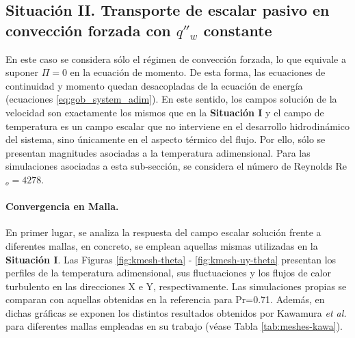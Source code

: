 \subsection{Situación II. Transporte de escalar pasivo en convección forzada con $q''_w$ constante}

En este caso se considera sólo el régimen de convección forzada, lo que equivale a suponer $\Pi=0$ en la ecuación de momento. De esta forma, las ecuaciones de continuidad y momento quedan desacopladas de la ecuación de energía (ecuaciones \ref{eq:gob_system_adim}). En este sentido, los campos solución de la velocidad son exactamente los mismos que en la \textbf{Situación I} y el campo de temperatura es un campo escalar que no interviene en el desarrollo hidrodinámico del sistema, sino únicamente en el aspecto térmico del flujo. Por ello, sólo se presentan magnitudes asociadas a la temperatura adimensional. Para las simulaciones asociadas a esta sub-sección, se considera el número de Reynolds Re$_o=4278$. 

\paragraph{Convergencia en Malla.}
En primer lugar, se analiza la respuesta del campo escalar solución frente a diferentes mallas, en concreto, se emplean aquellas mismas utilizadas en la \textbf{Situación I}.  Las Figuras \ref{fig:kmesh-theta} - \ref{fig:kmesh-uy-theta} presentan los perfiles de la temperatura adimensional, sus fluctuaciones y los flujos de calor turbulento en las direcciones X e Y, respectivamente. Las simulaciones propias se comparan con aquellas obtenidas en la referencia \cite{kawamura2000dns} para Pr=0.71. Además, en dichas gráficas se exponen los distintos resultados obtenidos por Kawamura \textit{et al.} para diferentes mallas empleadas en su trabajo (véase Tabla \ref{tab:meshes-kawa}). 


\begin{table}
\centering
{}
\caption{Resoluciones espaciales empleadas por Kawamura \textit{et al.} \cite{kawamura2000dns}.}
\label{tab:meshes-kawa}
\end{table}

